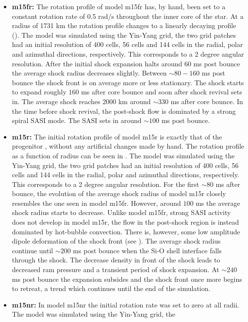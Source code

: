 \begin{itemize}
\item \textbf{m15fr:} The rotation profile of model m15fr has, by hand, been set to a constant rotation rate of 0.5 rad/s
throughout the inner core of the star. At a radius of 1731 km the rotation profile changes
to a linearly decaying profile (). The model was simulated using the Yin-Yang grid, the 
two grid patches had an initial resolution of 400 cells, 56 cells and 144 cells in the radial, polar and
azimuthal directions, respectively. This corresponds to a 2 degree angular resolution. 
After the initial shock expansion halts around $60$ ms post bounce the average shock radius decreases slightly.
Between $\sim 80 - 160$ ms post bounce the shock front is on average more or less stationary. 
The shock starts to expand roughly $160$ ms after core bounce and soon after shock revival sets in.
The average shock reaches $2000$ km around $\sim 330$ ms after core bounce.
In the time before shock revival, the post-shock flow is dominated by a strong spiral SASI mode. The SASI sets in around
$\sim 100$ ms post bounce.
\item \textbf{m15r:} The initial rotation profile of model m15r is exactly that of the progenitor \citep{heger_05}, without
any artificial changes made by hand. The rotation profile as a function of radius can be seen in .  
The model was simulated using the Yin-Yang grid, the two grid patches had an initial resolution of 400 cells, 
56 cells and 144 cells in the radial, polar and azimuthal directions, respectively. This corresponds to a 2 degree angular resolution.
For the first $\sim 80$ ms after bounce, the evolution of the average shock radius of model m15r closely resembles the
one seen in model m15fr. However, around $100$ ms the average shock radius starts to decrease. Unlike model m15fr, strong 
SASI activity does not develop in model m15r, the flow in the post-shock region is instead dominated by hot-bubble convection. There
is, however, some low amplitude dipole deformation of the shock front (see ).
The average shock radius continue until
$\sim 200$ ms post bounce when the Si-O shell interface falls through the shock. The decrease density in front of the shock leads
to decreased ram pressure and a transient period of shock expansion. At $\sim 240$ ms post bounce the expansion subsides and
the shock front once more begins to retreat, a trend which continues until the end of the simulation.  
\item \textbf{m15nr:} In model m15nr the initial rotation rate was set to zero at all radii. The model was simulated using the Yin-Yang grid, the

\end{itemize}
